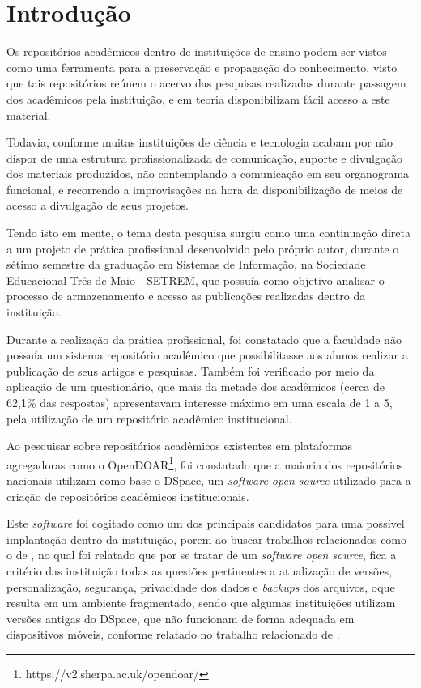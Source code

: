 \chapter*{Introdução} \label{chap:intro}

Os repositórios acadêmicos dentro de instituições de ensino
podem ser vistos como uma ferramenta para a preservação
e propagação do conhecimento, visto que tais repositórios reúnem
o acervo das pesquisas realizadas durante passagem dos acadêmicos
pela instituição, e em teoria disponibilizam fácil acesso a este
material.

Todavia, conforme \cite{PORTO:difusao_cientifica_recortes}
muitas instituições de ciência e tecnologia acabam por não
dispor de uma estrutura profissionalizada de comunicação,
suporte e divulgação dos materiais produzidos, não contemplando
a comunicação em seu organograma funcional, e recorrendo a
improvisações na hora da disponibilização de meios de acesso
a divulgação de seus projetos.

Tendo isto em mente, o tema desta pesquisa surgiu como uma
continuação direta a um projeto de prática profissional
desenvolvido pelo próprio autor, durante o sétimo
semestre da graduação em Sistemas de Informação, na
Sociedade Educacional Três de Maio - SETREM, que possuía
como objetivo analisar o processo de armazenamento e
acesso as publicações realizadas dentro da instituição.

Durante a realização da prática profissional, foi constatado
que a faculdade não possuía um sistema repositório acadêmico
que possibilitasse aos alunos realizar a publicação de seus
artigos e pesquisas. Também foi verificado por meio da aplicação
de um questionário, que mais da metade dos acadêmicos
(cerca de 62,1\% das respostas) apresentavam interesse máximo
em uma escala de 1 a 5, pela utilização de um repositório acadêmico
institucional.

Ao pesquisar sobre repositórios acadêmicos existentes em plataformas
agregadoras como o OpenDOAR\footnote{https://v2.sherpa.ac.uk/opendoar/},
foi constatado que a maioria dos repositórios nacionais utilizam como
base o DSpace, um \emph{software open source} utilizado para a
criação de repositórios acadêmicos institucionais.

Este \emph{software} foi cogitado como um dos principais candidatos
para uma possível implantação dentro da instituição, porem ao buscar
trabalhos relacionados como o de \cite{2019:RodrigoMoreira},
no qual foi relatado que por se tratar de um \emph{software open source},
fica a critério das instituição todas as questões pertinentes a
atualização de versões, personalização, segurança, privacidade dos
dados e \emph{backups} dos arquivos, oque resulta em um ambiente
fragmentado, sendo que algumas instituições utilizam versões antigas
do DSpace, que não funcionam de forma adequada em
dispositivos móveis, conforme relatado no trabalho relacionado
de \cite{2019:FernandesMacedes}.

